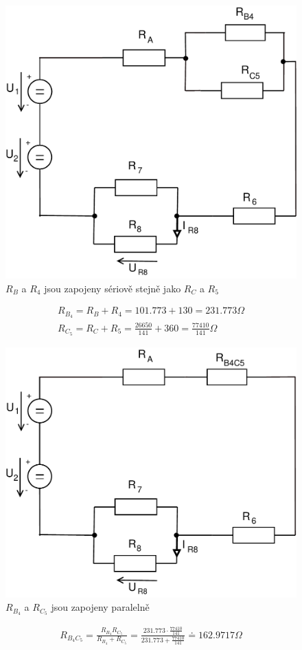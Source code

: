 \documentclass[12pt,a4paper]{article}
\begin{document}
	\begin{figure}[H]
		\center\includegraphics[width=0.6\linewidth]{obr/1_3}
		\caption*{$R_B$ a $R_4$ jsou zapojeny sériově stejně jako $R_C$ a $R_5$}
	\end{figure}
	\begin{gather*}
		R_{B_4} = R_B + R_4 = 101.773 + 130 = 231.773 \Omega \\
		R_{C_5} = R_C + R_5 = \frac{26650}{141} + 360 = \frac{77410}{141} \Omega
	\end{gather*}

	\begin{figure}[H]
		\center\includegraphics[width=0.6\linewidth]{obr/1_4}
		\caption*{$R_{B_4}$ a $R_{C_5}$ jsou zapojeny paralelně}
	\end{figure}
	\begin{gather*}
		R_{B_{4}C_{5}} = \frac{R_{B_4} R_{C_5}}{R_{B_4} + R_{C_5}} = \frac{231.773 \cdot \frac{77410}{141}}{231.773 
		+ \frac{77410}{141}} \doteq 162.9717 \Omega
	\end{gather*}
\end{document}
